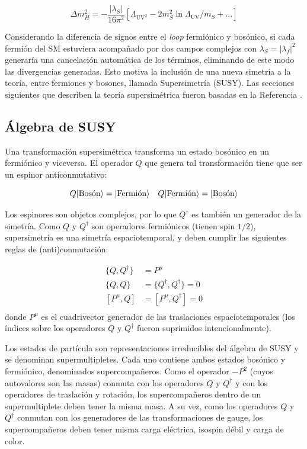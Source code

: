 \begin{equation}
	\Delta m_H^2 = - \frac{|\lambda_S|}{16 \pi^2}\left[\Lambda_{\text{UV}^2} - 2m_S^2 \ln{\Lambda_{\text{UV}}/m_S} + ... \right]
\end{equation}

Considerando la diferencia de signos entre el \textit{loop} fermiónico y bosónico, si cada fermión del SM estuviera acompañado por dos campos complejos con $\lambda_S = |\lambda_f|^2$ generaría una cancelación automática de los términos, eliminando de este modo las divergencias generadas. Esto motiva la inclusión de una nueva simetría a la teoría, entre fermiones y bosones, llamada Supersimetría (SUSY). Las secciones siguientes que describen la teoría supersimétrica fueron basadas en la Referencia \cite{martin}.

\subsection{Álgebra de SUSY}

Una transformación supersimétrica transforma un estado bosónico en un fermiónico y viceversa. El operador $Q$ que genera tal transformación tiene que ser un espinor anticonmutativo:

\begin{equation}
	Q\lvert\text{Bosón}\rangle = \lvert\text{Fermión}\rangle \quad Q\lvert\text{Fermión}\rangle = \lvert\text{Bosón}\rangle
\end{equation}

Los espinores son objetos complejos, por lo que $Q^{\dagger}$ es también un generador de la simetría. Como $Q$ y $Q^{\dagger}$ son operadores fermiónicos (tienen spin $1/2$), supersimetría es una simetría espaciotemporal, y deben cumplir las siguientes reglas de (anti)conmutación:

\begin{equation}
	\begin{split}	
		\{Q,Q^{\dagger}\} & = P^{\mu}\\
		\{Q,Q\} & = \{Q^{\dagger},Q^{\dagger}\} = 0\\
		[P^{\mu},Q] & = [P^{\mu},Q^{\dagger}] = 0\\
	\end{split}	
\end{equation}
%
donde $P^{\mu}$ es el cuadrivector generador de las traslaciones espaciotemporales (los índices sobre los operadores $Q$ y $Q^{\dagger}$ fueron suprimidos intencionalmente).


Los estados de partícula son representaciones irreducibles del álgebra de SUSY y se denominan supermultipletes. Cada uno contiene ambos estados bosónico y fermiónico, denominados supercompañeros. Como el operador $-P^2$ (cuyos autovalores son las masas) conmuta con los operadores $Q$ y $Q^{\dagger}$ y con los operadores de traslación y rotación, los supercompañeros dentro de un supermultiplete deben tener la misma masa. A su vez, como los operadores $Q$ y $Q^{\dagger}$ conmutan con los generadores de las transformaciones de gauge, los supercompañeros deben tener misma carga eléctrica, isospin débil y carga de color.

